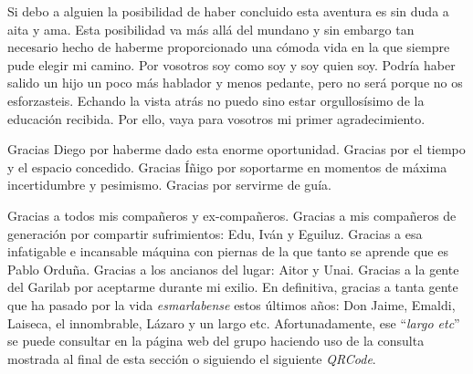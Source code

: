 



\begin{acknowledgements}      


Si debo a alguien la posibilidad de haber concluido esta aventura es sin duda a aita y ama.
Esta posibilidad va más allá del mundano y sin embargo tan necesario hecho de haberme proporcionado una cómoda vida en la que siempre pude elegir mi camino.
Por vosotros soy como soy y soy quien soy.
Podría haber salido un hijo un poco más hablador y menos pedante, pero no será porque no os esforzasteis.
Echando la vista atrás no puedo sino estar orgullosísimo de la educación recibida.
Por ello, vaya para vosotros mi primer agradecimiento.


Gracias Diego por haberme dado esta enorme oportunidad.
Gracias por el tiempo y el espacio concedido.
Gracias Íñigo por soportarme en momentos de máxima incertidumbre y pesimismo.
Gracias por servirme de guía.


Gracias a todos mis compañeros y ex-compañeros.
Gracias a mis compañeros de generación por compartir sufrimientos: Edu, Iván y Eguiluz.
Gracias a esa infatigable e incansable máquina con piernas de la que tanto se aprende que es Pablo Orduña.
Gracias a los ancianos del lugar: Aitor y Unai.
Gracias a la gente del Garilab por aceptarme durante mi exilio.
En definitiva, gracias a tanta gente que ha pasado por la vida \emph{esmarlabense} estos últimos años: Don Jaime, Emaldi, Laiseca, el innombrable, Lázaro y un largo etc.
Afortunadamente, ese ``\emph{largo etc}'' se puede consultar en la página web del grupo haciendo uso de la consulta mostrada al final de esta sección o siguiendo el siguiente \emph{QRCode}.




\end{acknowledgements}
